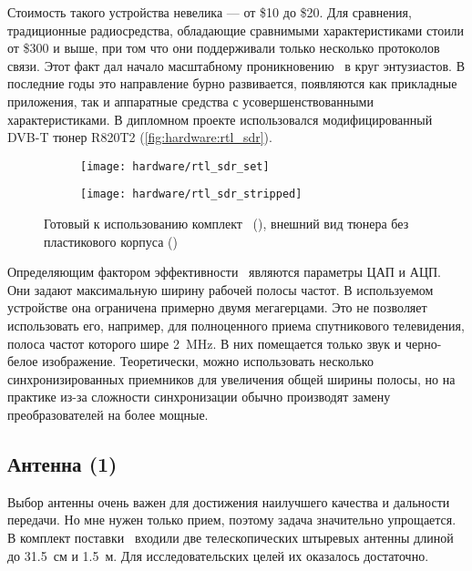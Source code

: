 Стоимость такого устройства невелика --- от \$10 до \$20. Для сравнения, традиционные радиосредства, обладающие сравнимыми характеристиками стоили от \$300 и выше, при том что они поддерживали только несколько протоколов связи. Этот факт дал начало масштабному проникновению \SDR\ в круг энтузиастов. В последние годы это направление бурно развивается, появляются как прикладные приложения, так и аппаратные средства с усовершенствованными характеристиками. В дипломном проекте использовался модифицированный DVB-T тюнер R820T2 (\autoref{fig:hardware:rtl_sdr}).

\begin{figure}[h]
  \centering
  \begin{subfigure}{0.45\textwidth}
    \texttt{[image: hardware/rtl\_sdr\_set]}
    \caption{}
    \label{fig:hardware:rtl_sdr_set}
  \end{subfigure}
  \begin{subfigure}{0.45\textwidth}
    \texttt{[image: hardware/rtl\_sdr\_stripped]}
    \caption{}
    \label{fig:hardware:rtl_sdr_stripped}
  \end{subfigure}
  \caption{Готовый к использованию комплект \sdr\ (), внешний вид тюнера без пластикового корпуса ()}
  \label{fig:hardware:rtl_sdr}
\end{figure}

Определяющим фактором эффективности \SDR\ являются параметры ЦАП и АЦП. Они задают максимальную ширину рабочей полосы частот. В используемом устройстве она ограничена примерно двумя мегагерцами. Это не позволяет использовать его, например, для полноценного приема спутникового телевидения, полоса частот которого шире \SI{2}{\mega\hertz}. В них помещается только звук и черно-белое изображение. Теоретически, можно использовать несколько синхронизированных приемников для увеличения общей ширины полосы, но на практике из-за сложности синхронизации обычно производят замену преобразователей на более мощные.

\subsection{Антенна (1)}

Выбор антенны очень важен для достижения наилучшего качества и дальности передачи. Но мне нужен только прием, поэтому задача значительно упрощается.
В комплект поставки \SDR\ входили две телескопических штыревых антенны длиной до \SI{31.5}{см} и \SI{1.5}{м}. Для исследовательских целей их оказалось достаточно.

